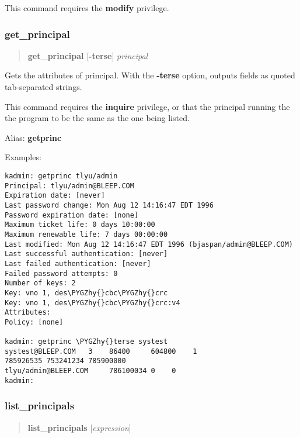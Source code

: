 \documentclass[letterpaper,10pt,english]{sphinxmanual}
\def\PYGZhy{\char`\-}
\begin{document}
This command requires the \textbf{modify} privilege.
\label{admin/admin_commands/kadmin_local:purgekeys-end}

\subsubsection{get\_principal}
\label{admin/admin_commands/kadmin_local:get-principal}\label{admin/admin_commands/kadmin_local:id7}\label{admin/admin_commands/kadmin_local:purgekeys-end}\begin{quote}

\textbf{get\_principal} {[}\textbf{-terse}{]} \emph{principal}
\end{quote}

Gets the attributes of principal.  With the \textbf{-terse} option, outputs
fields as quoted tab-separated strings.

This command requires the \textbf{inquire} privilege, or that the principal
running the the program to be the same as the one being listed.

Alias: \textbf{getprinc}

Examples:

\begin{Verbatim}[commandchars=\\\{\}]
kadmin: getprinc tlyu/admin
Principal: tlyu/admin@BLEEP.COM
Expiration date: [never]
Last password change: Mon Aug 12 14:16:47 EDT 1996
Password expiration date: [none]
Maximum ticket life: 0 days 10:00:00
Maximum renewable life: 7 days 00:00:00
Last modified: Mon Aug 12 14:16:47 EDT 1996 (bjaspan/admin@BLEEP.COM)
Last successful authentication: [never]
Last failed authentication: [never]
Failed password attempts: 0
Number of keys: 2
Key: vno 1, des\PYGZhy{}cbc\PYGZhy{}crc
Key: vno 1, des\PYGZhy{}cbc\PYGZhy{}crc:v4
Attributes:
Policy: [none]

kadmin: getprinc \PYGZhy{}terse systest
systest@BLEEP.COM   3    86400     604800    1
785926535 753241234 785900000
tlyu/admin@BLEEP.COM     786100034 0    0
kadmin:
\end{Verbatim}
\label{admin/admin_commands/kadmin_local:get-principal-end}

\subsubsection{list\_principals}
\label{admin/admin_commands/kadmin_local:get-principal-end}\label{admin/admin_commands/kadmin_local:id8}\label{admin/admin_commands/kadmin_local:list-principals}\begin{quote}

\textbf{list\_principals} {[}\emph{expression}{]}
\end{quote}
\end{document}
